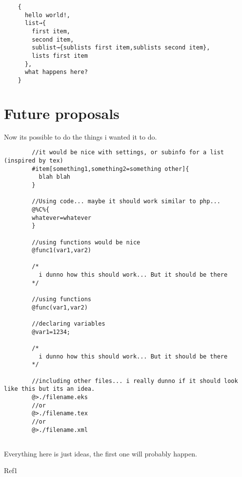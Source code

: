 \documentclass{book}
\begin{document}
	\begin{verbatim}
	{
	  hello world!,
	  list→{
	    first item,
	    second item,
	    sublist→{sublists first item,sublists second item},
	    lists first item
	  },
	  what happens here?
	}
	\end{verbatim}
	
	\chapter{Future proposals}
	
	Now its possible to do the things i wanted it to do.
	
	\begin{verbatim}
		//it would be nice with settings, or subinfo for a list (inspired by tex)
		#item[something1,something2=something other]{
		  blah blah
		}
		
		//Using code... maybe it should work similar to php...
		@%C%{
		whatever=whatever
		}
		
		//using functions would be nice
		@func1(var1,var2)
		
		/*
		  i dunno how this should work... But it should be there
		*/
		
		//using functions
		@func(var1,var2)
		
		//declaring variables
		@var1=1234;
		
		/*
		  i dunno how this should work... But it should be there
		*/
		
		//including other files... i really dunno if it should look like this but its an idea.
		@>./filename.eks
		//or
		@>./filename.tex
		//or
		@>./filename.xml		
		
	\end{verbatim}
	
	Everything here is just ideas, the first one will probably happen.
	
	\begin{thebibliography}{1}
	
		Ref1
	
	\end{thebibliography}
	
	
\end{document}

